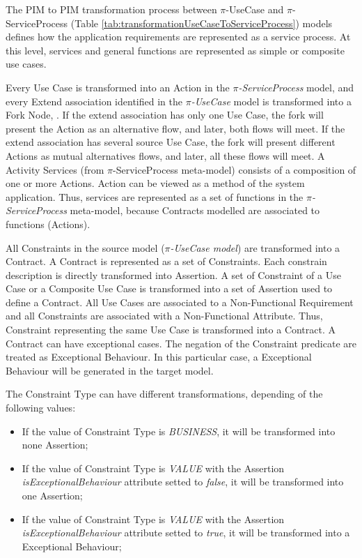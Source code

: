The PIM to PIM transformation process between $\pi$-UseCase and
$\pi$-ServiceProcess (Table \ref{tab:transformationUseCaseToServiceProcess})
models defines how the application requirements are represented as a service
process. At this level, services and general functions are represented as simple
or composite use cases.

Every {\sc Use Case} is transformed into
an {\sc Action} in the \textit{$\pi$-ServiceProcess} model, and every {\sc
Extend} association identified in the \textit{$\pi$-UseCase} model is
transformed into a {\sc Fork Node}, . If the extend
association has only one {\sc Use Case}, the fork will present the {\sc Action} as an alternative flow, and later, both flows will meet. If the extend association has several source
{\sc Use Case}, the fork will present different {\sc Actions} as mutual
alternatives flows, and later, all these flows will meet. A {\sc Activity
Services} (from $\pi$-ServiceProcess meta-model) consists of a composition of
one or more {\sc Actions}. {\sc Action} can be viewed as a method of
the system application. Thus, services are represented as a set of functions in
the \textit{$\pi$-ServiceProcess} meta-model, because {\sc Contracts} modelled
are associated to functions ({\sc Actions}).

All {\sc Constraints} in the source model (\textit{$\pi$-UseCase model}) are
transformed into a {\sc Contract}. A {\sc Contract} is represented as a set of {\sc Constraints}. Each
constrain description is directly transformed into {\sc Assertion}. A set of
{\sc Constraint} of a {\sc Use Case} or a {\sc Composite Use Case} is
transformed into a set of {\sc Assertion} used to define a
{\sc Contract}. All {\sc Use Cases} are associated to a {\sc Non-Functional
Requirement} and all {\sc Constraints} are associated with a {\sc Non-Functional Attribute}. Thus,
{\sc Constraint} representing the same {\sc Use Case} is transformed into a
{\sc Contract}. A {\sc Contract} can have exceptional cases. The negation of the
{\sc Constraint} predicate are treated as {\sc Exceptional Behaviour}. In this
particular case, a {\sc Exceptional Behaviour} will be generated in the target
model. 

The {\sc Constraint Type} can have different transformations, depending of the
following values:

\begin{itemize}
\item If the value of {\sc Constraint Type} is \textit{BUSINESS}, it will be
transformed into none {\sc Assertion};
\item If the value of {\sc Constraint Type} is \textit{VALUE} with the
{\sc Assertion} \textit{isExceptionalBehaviour} attribute setted to
\textit{false}, it will be transformed into one {\sc Assertion};
\item If the value of {\sc Constraint Type} is \textit{VALUE} with the
{\sc Assertion} \textit{isExceptionalBehaviour} attribute setted to
\textit{true}, it will be transformed into a {\sc Exceptional Behaviour};
\end{itemize}

